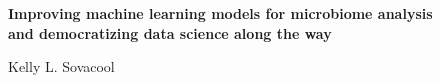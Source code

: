 \documentclass[letterpaper,12pt]{report}
\begin{document}
\begin{center}
\textbf{\large
Improving machine learning models for microbiome analysis\\
and democratizing data science along the way
}

\vspace{0.2\baselineskip}
Kelly L. Sovacool
\end{center}


\end{document}
